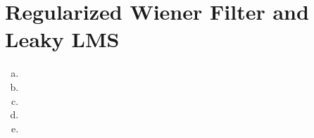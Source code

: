 \section{Regularized Wiener Filter and Leaky LMS}\label{sec:p4}

\begin{enumerate}[(a)]
\item

\item 

\item

\item

\item

\end{enumerate}